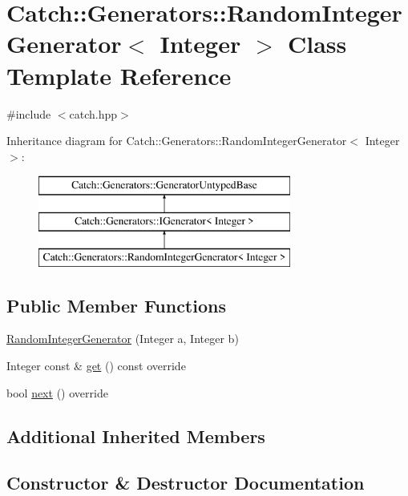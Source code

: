 \hypertarget{class_catch_1_1_generators_1_1_random_integer_generator}{}\section{Catch\+:\+:Generators\+:\+:Random\+Integer\+Generator$<$ Integer $>$ Class Template Reference}
\label{class_catch_1_1_generators_1_1_random_integer_generator}


{\ttfamily \#include $<$catch.\+hpp$>$}

Inheritance diagram for Catch\+:\+:Generators\+:\+:Random\+Integer\+Generator$<$ Integer $>$\+:\begin{figure}[H]
\begin{center}
\leavevmode
\includegraphics[height=3.000000cm]{class_catch_1_1_generators_1_1_random_integer_generator}
\end{center}
\end{figure}
\subsection*{Public Member Functions}
\begin{DoxyCompactItemize}
\item 
\mbox{\hyperlink{class_catch_1_1_generators_1_1_random_integer_generator_a886d16c899ad70781b83a0e8f9d2cf96}{Random\+Integer\+Generator}} (Integer a, Integer b)
\item 
Integer const  \& \mbox{\hyperlink{class_catch_1_1_generators_1_1_random_integer_generator_aafbdf9028762f5e8f8ca9c317d686fca}{get}} () const override
\item 
bool \mbox{\hyperlink{class_catch_1_1_generators_1_1_random_integer_generator_aaa3db70fbdfa3e8dcb61fb5592eba81f}{next}} () override
\end{DoxyCompactItemize}
\subsection*{Additional Inherited Members}


\subsection{Constructor \& Destructor Documentation}
\mbox{\label{class_catch_1_1_generators_1_1_random_integer_generator_a886d16c899ad70781b83a0e8f9d2cf96}} 
